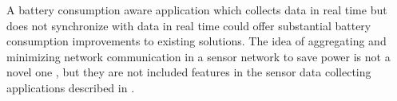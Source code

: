 A battery consumption aware application which collects data in real time but does not synchronize with data in real time could offer substantial battery consumption improvements to existing solutions. The idea of aggregating and minimizing network communication in a sensor network to save power is not a novel one \parencite{korteweg2007data} \parencite{mhatre2004design}, but they are not included features in the sensor data collecting applications described in . 
